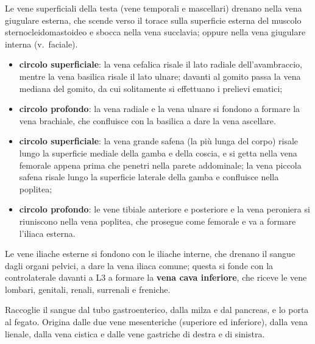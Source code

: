 Le vene superficiali della testa (vene temporali e mascellari) drenano nella vena giugulare
esterna, che scende verso il torace sulla superficie esterna del muscolo sternocleidomastoideo e
sbocca nella vena succlavia; oppure nella vena giugulare interna (v.\ faciale).

\begin{itemize}
  \item \textbf{circolo superficiale}: la vena cefalica risale il lato radiale dell'avambraccio,
    mentre la vena basilica risale il lato ulnare; davanti al gomito passa la vena mediana del
    gomito, da cui solitamente si effettuano i prelievi ematici;
  \item \textbf{circolo profondo}: la vena radiale e la vena ulnare si fondono a formare la vena
    brachiale, che confluisce con la basilica a dare la vena ascellare.
\end{itemize}

\begin{itemize}
  \item \textbf{circolo superficiale}: la vena grande safena (la più lunga del corpo) risale lungo
    la superficie mediale della gamba e della coscia, e si getta nella vena femorale appena prima
    che penetri nella parete addominale; la vena piccola safena risale lungo la superficie
    laterale della gamba e confluisce nella poplitea;
  \item \textbf{circolo profondo}: le vene tibiale anteriore e posteriore e la vena peroniera si
    riuniscono nella vena poplitea, che prosegue come femorale e va a formare l'iliaca esterna.
\end{itemize}

Le vene iliache esterne si fondono con le iliache interne, che drenano il sangue dagli organi
pelvici, a dare la vena iliaca comune; questa si fonde con la controlaterale davanti a L3 a
formare la \textbf{vena cava inferiore}, che riceve le vene lombari, genitali, renali, surrenali e
freniche.

Raccoglie il sangue dal tubo gastroenterico, dalla milza e dal pancreas, e lo porta al fegato.
Origina dalle due vene mesenteriche (superiore ed inferiore), dalla vena lienale, dalla vena
cistica e dalle vene gastriche di destra e di sinistra.

